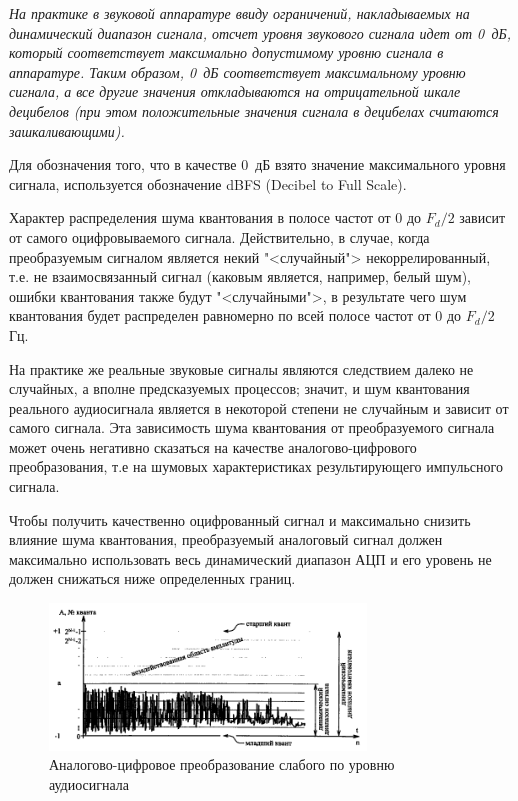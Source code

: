 \documentclass[oneside, final, 14pt]{extreport}
\begin{document}
\emph{На практике в звуковой аппаратуре ввиду ограничений, накладываемых на динамический диапазон сигнала, отсчет уровня звукового сигнала идет от 0~дБ, который соответствует максимально допустимому уровню сигнала в аппаратуре. Таким образом, 0~дБ соответствует максимальному уровню сигнала, а все другие значения откладываются на отрицательной шкале децибелов (при этом положительные значения сигнала в децибелах считаются зашкаливающими).}

Для обозначения того, что в качестве 0~дБ взято значение максимального уровня сигнала, используется обозначение dBFS (Decibel to Full Scale).

Характер распределения шума квантования в полосе частот от 0 до $F_d/2$ зависит от самого оцифровываемого сигнала. Действительно, в случае, когда преобразуемым сигналом является некий "<случайный"> некоррелированный, т.е. не взаимосвязанный сигнал (каковым является, например, белый шум), ошибки квантования также будут "<случайными">, в результате чего шум квантования будет распределен равномерно по всей полосе частот от 0 до $F_d/2$ Гц.

На практике же реальные звуковые сигналы являются следствием далеко не случайных, а вполне предсказуемых процессов; значит, и шум квантования реального аудиосигнала является в некоторой степени не случайным и зависит от самого сигнала. Эта зависимость шума квантования от преобразуемого сигнала может очень негативно сказаться на качестве аналогово-цифрового преобразования, т.е
на шумовых характеристиках результирующего импульсного сигнала.

Чтобы получить качественно оцифрованный сигнал и максимально снизить влияние шума квантования, преобразуемый аналоговый сигнал должен максимально использовать весь динамический диапазон АЦП и его уровень не должен снижаться ниже определенных границ.

\begin{figure}[h]
\centering
\includegraphics[width=0.75\textwidth]{pic-digital-10}
\caption{Аналогово-цифровое преобразование слабого по уровню аудиосигнала}
\label{pic-digital-10}
\end{figure}
\end{document}
